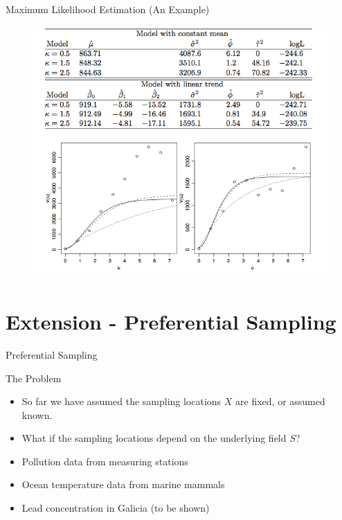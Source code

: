 \documentclass{beamer}
\begin{document}
\begin{frame}{Maximum Likelihood Estimation (An Example)} %
	\begin{figure}
		\centering
		\includegraphics[scale = 0.45]{Images/Pic1}
	\end{figure}
	
\end{frame}

\section{Extension - Preferential Sampling}

\begin{frame}{Preferential Sampling}
\begin{block}{The Problem}
\begin{itemize}
\item So far we have assumed the sampling locations $X$ are fixed, or assumed known.
\item What if the sampling locations depend on the underlying field $S$?
\end{itemize}
\end{block}

\begin{example}
\begin{itemize}
\item Pollution data from measuring stations
\item Ocean temperature data from marine mammals
\item Lead concentration in Galicia (to be shown)
\end{itemize}
\end{example}
\end{frame}
\end{document}
